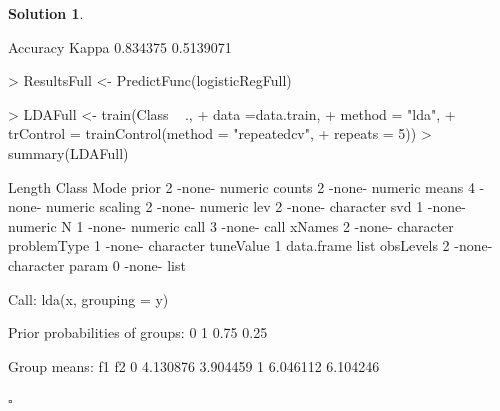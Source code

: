 \documentclass[twoside]{article}
\theoremstyle{definition}
\newtheorem*{solutionT}{Solution}
\newenvironment{solution}{\begin{cBox}\begin{solutionT}}{\hfill{\scriptsize\ensuremath{\square}}\end{solutionT}\end{cBox}}
\theoremstyle{definition}
\begin{document}
\begin{enumerate}
\begin{solution}
\begin{Schunk}
\begin{Soutput}
  Accuracy  Kappa    
  0.834375  0.5139071
\end{Soutput}
\end{Schunk}
\begin{Schunk}
\end{Schunk}
\begin{Schunk}
\begin{Sinput}
> ResultsFull <- PredictFunc(logisticRegFull)
\end{Sinput}
\end{Schunk}
\begin{Schunk}
\begin{Sinput}
> LDAFull <- train(Class ~ .,
+                      data =data.train,
+                      method = "lda",
+                      trControl = trainControl(method = "repeatedcv", 
+                                               repeats = 5))
> summary(LDAFull)
\end{Sinput}
\begin{Soutput}
            Length Class      Mode     
prior       2      -none-     numeric  
counts      2      -none-     numeric  
means       4      -none-     numeric  
scaling     2      -none-     numeric  
lev         2      -none-     character
svd         1      -none-     numeric  
N           1      -none-     numeric  
call        3      -none-     call     
xNames      2      -none-     character
problemType 1      -none-     character
tuneValue   1      data.frame list     
obsLevels   2      -none-     character
param       0      -none-     list     
\end{Soutput}
\begin{Soutput}
Call:
lda(x, grouping = y)

Prior probabilities of groups:
   0    1 
0.75 0.25 

Group means:
        f1       f2
0 4.130876 3.904459
1 6.046112 6.104246


\end{Soutput}
\end{Schunk}
\end{solution}
\end{enumerate}
\end{document}
